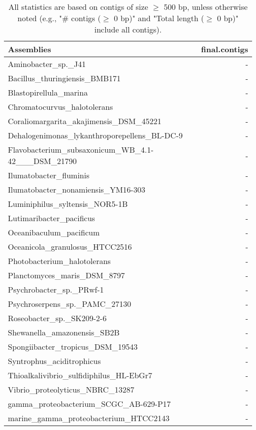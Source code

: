 \documentclass[12pt,a4paper]{article}
\begin{document}
\begin{table}[ht]
\begin{center}
\caption{All statistics are based on contigs of size $\geq$ 500 bp, unless otherwise noted (e.g., "\# contigs ($\geq$ 0 bp)" and "Total length ($\geq$ 0 bp)" include all contigs).}
\begin{tabular}{|l*{1}{|r}|}
\hline
Assemblies & final.contigs \\ \hline
Aminobacter\_sp.\_J41 & - \\ \hline
Bacillus\_thuringiensis\_BMB171 & - \\ \hline
Blastopirellula\_marina & - \\ \hline
Chromatocurvus\_halotolerans & - \\ \hline
Coraliomargarita\_akajimensis\_DSM\_45221 & - \\ \hline
Dehalogenimonas\_lykanthroporepellens\_BL-DC-9 & - \\ \hline
Flavobacterium\_subsaxonicum\_WB\_4.1-42\_\_\_DSM\_21790 & - \\ \hline
Ilumatobacter\_fluminis & - \\ \hline
Ilumatobacter\_nonamiensis\_YM16-303 & - \\ \hline
Luminiphilus\_syltensis\_NOR5-1B & - \\ \hline
Lutimaribacter\_pacificus & - \\ \hline
Oceanibaculum\_pacificum & - \\ \hline
Oceanicola\_granulosus\_HTCC2516 & - \\ \hline
Photobacterium\_halotolerans & - \\ \hline
Planctomyces\_maris\_DSM\_8797 & - \\ \hline
Psychrobacter\_sp.\_PRwf-1 & - \\ \hline
Psychroserpens\_sp.\_PAMC\_27130 & - \\ \hline
Roseobacter\_sp.\_SK209-2-6 & - \\ \hline
Shewanella\_amazonensis\_SB2B & - \\ \hline
Spongiibacter\_tropicus\_DSM\_19543 & - \\ \hline
Syntrophus\_aciditrophicus & - \\ \hline
Thioalkalivibrio\_sulfidiphilus\_HL-EbGr7 & - \\ \hline
Vibrio\_proteolyticus\_NBRC\_13287 & - \\ \hline
gamma\_proteobacterium\_SCGC\_AB-629-P17 & - \\ \hline
marine\_gamma\_proteobacterium\_HTCC2143 & - \\ \hline
\end{tabular}
\end{center}
\end{table}
\end{document}
